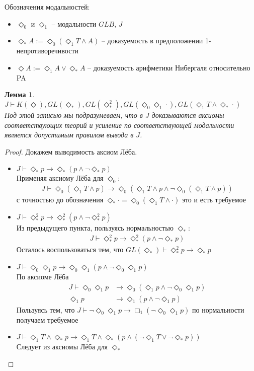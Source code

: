 \documentclass[12pt,a4paper,oneside]{article}
\newtheorem{lemma}{Лемма}
\begin{document}
Обозначения модальностей:
\begin{itemize}
\item $\Diamond_0 $ и $\Diamond_1 $ -- модальности $GLB$, $J$
\item $\Diamond_* A := \Diamond_0 (\Diamond_1 T \wedge  A)$ -- доказуемость в предположении 1-непротиворечивости
\item $\Diamond A  := \Diamond_1 A \vee  \Diamond_* A$ -- доказуемость арифметики Нибергаля относительно PA
\end{itemize}

\begin{lemma}
$J \vdash  K(\Diamond ), GL(\Diamond_* ), GL(\Diamond_* ^2), GL(\Diamond_0 \Diamond_1 \cdot), GL(\Diamond_1 T \wedge  \Diamond_* \cdot)$\\
Под этой записью мы подразумеваем, что в $J$ доказываются аксиомы соответствующих теорий
и усиление по соответствующей модальности является допустимым правилом вывода в $J$.
\end{lemma}
\begin{proof}
Докажем выводимость аксиом Лёба. 
\begin{itemize}
\item $J \vdash  \Diamond_* p \rightarrow  \Diamond_* (p \wedge  \neg \Diamond_* p)$\\
Применяя аксиому Лёба для $\Diamond_0 $:
\begin{align*}
J \vdash  \Diamond_0 (\Diamond_1 T \wedge  p) \rightarrow  \Diamond_0 (\Diamond_1 T \wedge  p \wedge  \neg \Diamond_0 (\Diamond_1 T \wedge  p))
\end{align*}
с точностью до обозначения $\Diamond_* \cdot = \Diamond_0 (\Diamond_1 T \wedge  \cdot)$ это и есть требуемое
\item $J \vdash  \Diamond_* ^2 p \rightarrow  \Diamond_* ^2(p \wedge  \neg \Diamond_* ^2 p)$\\
Из предыдущего пункта, пользуясь нормальностью $\Diamond_* $:
\begin{align*}
J \vdash  \Diamond_* ^2 p \rightarrow  \Diamond_* ^2(p \wedge  \neg \Diamond_* p)
\end{align*}
Осталось воспользоваться тем, что $GL(\Diamond_* ) \vdash  \Diamond_* ^2 p \rightarrow  \Diamond_* p$
\item $J \vdash  \Diamond_0 \Diamond_1 p \rightarrow  \Diamond_0 \Diamond_1 (p \wedge  \neg \Diamond_0 \Diamond_1 p)$\\
По аксиоме Лёба
\begin{align*}
J \vdash  \Diamond_0 \Diamond_1 p &\rightarrow  \Diamond_0 (\Diamond_1 p \wedge  \neg \Diamond_0 \Diamond_1 p)
\\\Diamond_1 p &\rightarrow  \Diamond_1 (p \wedge  \neg \Diamond_1 p)
\end{align*}
Пользуясь тем, что $J \vdash  \neg \Diamond_0 \Diamond_1 p \rightarrow  \Box_1 (\neg \Diamond_0 \Diamond_1 p)$ по нормальности получаем требуемое
\item $J \vdash  \Diamond_1 T \wedge  \Diamond_* p \rightarrow  \Diamond_1 T \wedge  \Diamond_* (p \wedge  (\neg \Diamond_1 T \vee  \neg \Diamond_* p))$\\
Следует из аксиомы Лёба для $\Diamond_* $
\end{itemize}
\end{proof}
\end{document}
